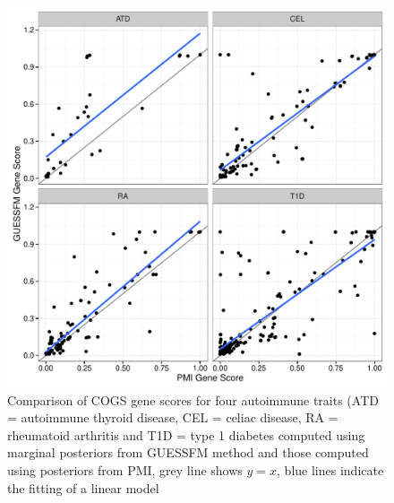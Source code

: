 \documentclass[a4paper,11pt]{report}
\begin{document}

\begin{figure}[h]
\includegraphics[width=\textwidth]{gfm_vs_pmi_gs.pdf}
\caption{Comparison of COGS gene scores for four autoimmune traits (ATD = autoimmune thyroid disease, CEL = celiac disease, RA = rheumatoid arthritis and T1D = type 1 diabetes computed using marginal posteriors from GUESSFM method and those computed using posteriors from PMI, grey line shows $y=x$, blue lines indicate the fitting of a linear model}
\label{fig:gfm_vs_pmi_gs}
\end{figure}
\end{document}
